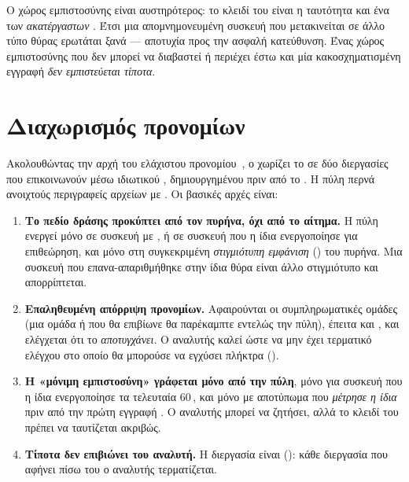 Ο χώρος εμπιστοσύνης είναι αυστηρότερος: το κλειδί του είναι η ταυτότητα και ένα
 των \emph{ακατέργαστων} . Έτσι μια απομνημονευμένη
συσκευή που μετακινείται σε άλλο τύπο θύρας ερωτάται ξανά — αποτυχία προς την
ασφαλή κατεύθυνση. Ένας χώρος εμπιστοσύνης που δεν μπορεί να διαβαστεί ή
περιέχει έστω και μία κακοσχηματισμένη εγγραφή \emph{δεν εμπιστεύεται τίποτα}.

\section{Διαχωρισμός προνομίων}
\label{sec:design-privsep}

Ακολουθώντας την αρχή του ελάχιστου προνομίου~\cite{provos2003privsep}, ο
 χωρίζει το \Probolos{} σε δύο διεργασίες που επικοινωνούν μέσω
ιδιωτικού  , δημιουργημένου πριν από το
. Η πύλη περνά ανοιχτούς περιγραφείς αρχείων με .
Οι βασικές αρχές είναι:

\begin{enumerate}
  \item \textbf{Το πεδίο δράσης προκύπτει από τον πυρήνα, όχι από το αίτημα.} Η
        πύλη ενεργεί μόνο σε συσκευή  με , ή σε
        συσκευή που η ίδια ενεργοποίησε για επιθεώρηση, και μόνο στη
        συγκεκριμένη \emph{στιγμιότυπη εμφάνιση} () του πυρήνα. Μια
        συσκευή που επανα-απαριθμήθηκε στην ίδια θύρα είναι άλλο στιγμιότυπο
        και απορρίπτεται.
  \item \textbf{Επαληθευμένη απόρριψη προνομίων.} Αφαιρούνται οι συμπληρωματικές
        ομάδες (μια ομάδα  ή  που θα επιβίωνε θα
        παρέκαμπτε εντελώς την πύλη), έπειτα  και , και ελέγχεται
        ότι το  \emph{αποτυγχάνει}. Ο αναλυτής καλεί
         ώστε να μην έχει τερματικό ελέγχου στο οποίο θα
        μπορούσε να εγχύσει πλήκτρα ().
  \item \textbf{Η «μόνιμη εμπιστοσύνη» γράφεται μόνο από την πύλη}, μόνο για
        συσκευή που η ίδια ενεργοποίησε τα τελευταία 60\,, και μόνο με
        αποτύπωμα που \emph{μέτρησε η ίδια} πριν από την πρώτη εγγραφή
        . Ο αναλυτής μπορεί να ζητήσει, αλλά το κλειδί του
        πρέπει να ταυτίζεται ακριβώς.
  \item \textbf{Τίποτα δεν επιβιώνει του αναλυτή.} Η διεργασία  είναι
         (): κάθε διεργασία που
        αφήνει πίσω του ο αναλυτής τερματίζεται.
\end{enumerate}

